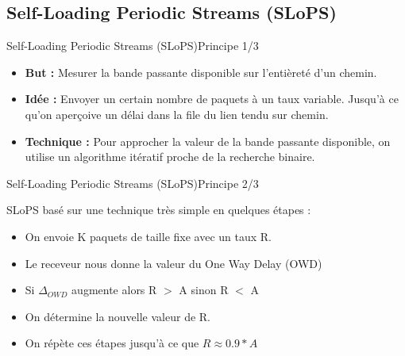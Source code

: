 \documentclass[compress]{beamer}
\begin{document}
\subsection{Self-Loading Periodic Streams (SLoPS)}
\begin{frame}{Self-Loading Periodic Streams (SLoPS)}{Principe 1/3}
\begin{itemize}
\item \textbf{But :}  Mesurer la {\color{red}bande passante disponible} sur l'entièreté d'un chemin.
\pause
\item \textbf{Idée :}  Envoyer un certain nombre de paquets à un taux variable. Jusqu'à ce qu'on aperçoive un délai dans la file du lien tendu sur chemin.
\pause
\item \textbf{Technique :} Pour approcher la valeur de la bande passante
disponible, on utilise un algorithme itératif proche de la recherche binaire.
\end{itemize}
\end{frame}
\begin{frame}{Self-Loading Periodic Streams (SLoPS)}{Principe 2/3}

SLoPS basé sur une technique très simple en quelques étapes :
\begin{itemize}
\item On envoie K paquets de taille fixe avec un taux R.
\pause
\item Le receveur nous donne la valeur du One Way Delay (OWD)
\item Si $\Delta_{OWD}$ augmente alors R $>$ A sinon R $<$ A
\pause
\item On détermine la nouvelle valeur de R.
\item On répète ces étapes jusqu'à ce que $R \approx 0.9 * A$
\end{itemize}
\end{frame}
\end{document}
